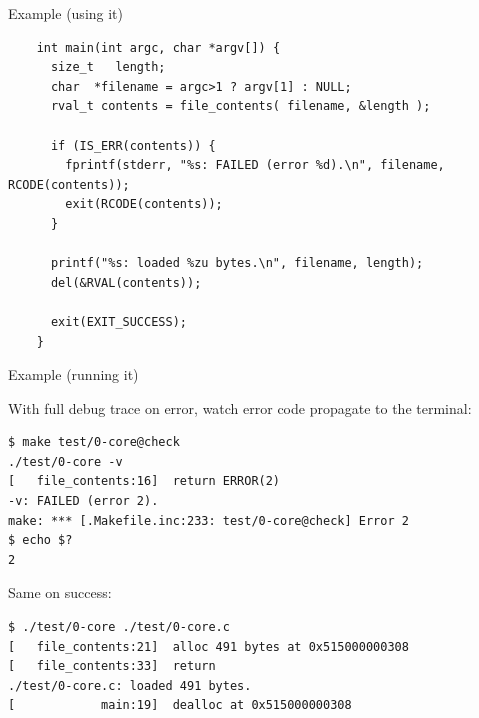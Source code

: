 \begin{frame}[fragile]{Example (using it)}

  \begin{lstlisting}
    int main(int argc, char *argv[]) {
      size_t   length;
      char  *filename = argc>1 ? argv[1] : NULL;
      rval_t contents = file_contents( filename, &length );

      if (IS_ERR(contents)) {
        fprintf(stderr, "%s: FAILED (error %d).\n", filename, RCODE(contents));
        exit(RCODE(contents));
      }
      
      printf("%s: loaded %zu bytes.\n", filename, length);
      del(&RVAL(contents));
      
      exit(EXIT_SUCCESS);
    }
  \end{lstlisting}

\end{frame}


\begin{frame}[fragile]{Example (running it)}

  With full debug trace on error, watch error code propagate to the terminal:

\begin{verbatim}
$ make test/0-core@check
./test/0-core -v
[   file_contents:16]  return ERROR(2) 
-v: FAILED (error 2).
make: *** [.Makefile.inc:233: test/0-core@check] Error 2
$ echo $?
2
\end{verbatim}

  Same on success:

\begin{verbatim}
$ ./test/0-core ./test/0-core.c
[   file_contents:21]  alloc 491 bytes at 0x515000000308
[   file_contents:33]  return 
./test/0-core.c: loaded 491 bytes.
[            main:19]  dealloc at 0x515000000308
\end{verbatim}
  
\end{frame}


